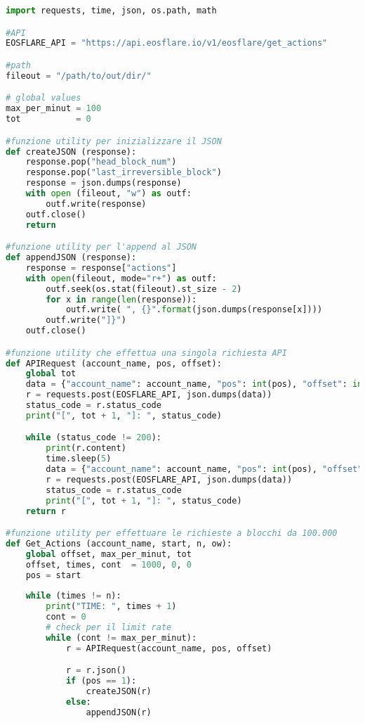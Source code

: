 \begin{lstlisting}[language=Python, label={actions_download}, captionpos=b, caption=Actions Retrieval]
import requests, time, json, os.path, math

#API
EOSFLARE_API = "https://api.eosflare.io/v1/eosflare/get_actions"

#path
fileout = "/path/to/out/dir/"

# global values
max_per_minut = 100
tot           = 0

#funzione utility per inizializzare il JSON
def createJSON (response):
    response.pop("head_block_num")
    response.pop("last_irreversible_block")
    response = json.dumps(response)
    with open (fileout, "w") as outf:
        outf.write(response)
    outf.close()
    return

#funzione utility per l'append al JSON
def appendJSON (response):
    response = response["actions"]
    with open(fileout, mode="r+") as outf:
        outf.seek(os.stat(fileout).st_size - 2)
        for x in range(len(response)):
            outf.write( ", {}".format(json.dumps(response[x])))
        outf.write("]}")
    outf.close()

#funzione utility che effettua una singola richiesta API
def APIRequest (account_name, pos, offset):
    global tot
    data = {"account_name": account_name, "pos": int(pos), "offset": int(offset)}
    r = requests.post(EOSFLARE_API, json.dumps(data))
    status_code = r.status_code
    print("[", tot + 1, "]: ", status_code)

    while (status_code != 200):
        print(r.content)
        time.sleep(5)
        data = {"account_name": account_name, "pos": int(pos), "offset": int(offset)}
        r = requests.post(EOSFLARE_API, json.dumps(data))
        status_code = r.status_code
        print("[", tot + 1, "]: ", status_code)
    return r

#funzione utility per effettuare le richieste a blocchi da 100.000
def Get_Actions (account_name, start, n, ow):
    global offset, max_per_minut, tot
    offset, times, cont  = 1000, 0, 0
    pos = start
    
    while (times != n):
        print("TIME: ", times + 1)
        cont = 0
        # check per il limit rate
        while (cont != max_per_minut):
            r = APIRequest(account_name, pos, offset)

            r = r.json()
            if (pos == 1):
                createJSON(r)
            else:
                appendJSON(r)
                

\end{lstlisting}
